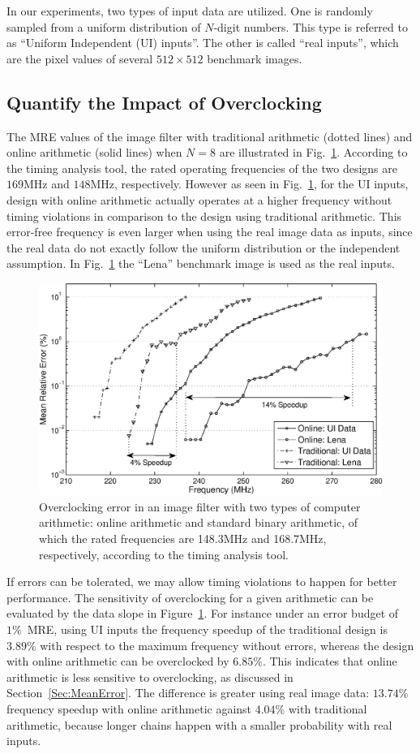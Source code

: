 \documentclass[journal]{IEEEtran}
\begin{document}
In our experiments, two types of input data are utilized. One is randomly sampled from a uniform distribution of $N$-digit numbers. This type is referred to as ``Uniform Independent (UI) inputs''. The other is called ``real inputs'', which are the pixel values of several $512\times512$ benchmark images.

\subsection{Quantify the Impact of Overclocking}
The MRE values of the image filter with traditional arithmetic (dotted lines) and online arithmetic (solid lines) when $N=8$ are illustrated in Fig.~\ref{Fig:MRE_ImageFilter}. According to the timing analysis tool, the rated operating frequencies of the two designs are $169$MHz and $148$MHz, respectively. However as seen in Fig.~\ref{Fig:MRE_ImageFilter}, for the UI inputs, design with online arithmetic actually operates at a higher frequency without timing violations in comparison to the design using traditional arithmetic. This error-free frequency is even larger when using the real image data as inputs, since the real data do not exactly follow the uniform distribution or the independent assumption. In Fig.~\ref{Fig:MRE_ImageFilter} the ``Lena'' benchmark image is used as the real inputs.

\begin{figure}
    \centering
    \includegraphics[width=.48\textwidth]{./Figures/Exps/MRE.eps}
    \caption{Overclocking error in an image filter with two types of computer arithmetic: online arithmetic and standard binary arithmetic, of which the rated frequencies are 148.3MHz and 168.7MHz, respectively, according to the timing analysis tool.}
    \label{Fig:MRE_ImageFilter}
\end{figure}

If errors can be tolerated, we may allow timing violations to happen for better performance. The sensitivity of overclocking for a given arithmetic can be evaluated by the data slope in Figure~\ref{Fig:MRE_ImageFilter}. For instance under an error budget of $1\%$~MRE, using UI inputs the frequency speedup of the traditional design is $3.89\%$ with respect to the maximum frequency without errors, whereas the design with online arithmetic can be overclocked by $6.85\%$. This indicates that online arithmetic is less sensitive to overclocking, as discussed in Section~\ref{Sec:MeanError}. The difference is greater using real image data: $13.74\%$ frequency speedup with online arithmetic against $4.04\%$ with traditional arithmetic, because longer chains happen with a smaller probability with real inputs.
\end{document}
